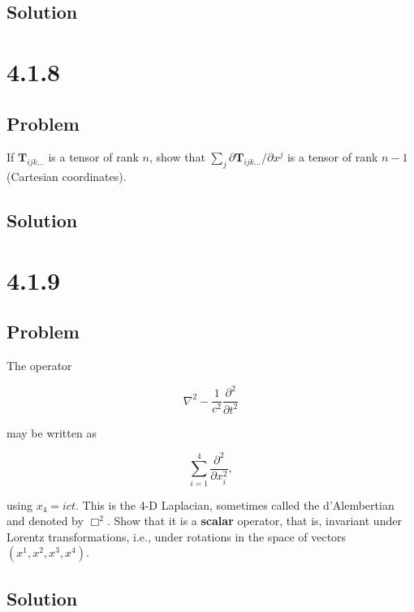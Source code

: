 \documentclass[12pt]{article}
\begin{document}
\subsection{Solution}

\newpage
\section{4.1.8}

\subsection{Problem}

If \(\textbf{T}_{ijk\ldots}\) is a tensor of rank \(n\), show that
\(\sum_j \partial \textbf{T}_{ijk\ldots}/\partial x^j\) is a tensor of rank \(n - 1\)
(Cartesian coordinates).

\subsection{Solution}

\newpage
\section{4.1.9}

\subsection{Problem}

The operator

\[
    \nabla^2 - \frac{1}{c^2} \frac{\partial^2}{\partial t^2}
\]

may be written as

\[
    \sum^4_{i = 1} \frac{\partial^2}{\partial x^2_i},
\]

using \(x_4 = ict\). This is the 4-D Laplacian, sometimes called the d'Alember\-tian and denoted
by \(\Box^2\). Show that it is a \textbf{scalar} operator, that is, invariant under Lorentz
transformations, i.e., under rotations in the space of vectors \((x^1, x^2, x^3, x^4)\).

\subsection{Solution}

\newpage


\nocite{arfken2013mathematical}
\nocite{El-Deeb_PEU-356_Assignments}
\end{document}
